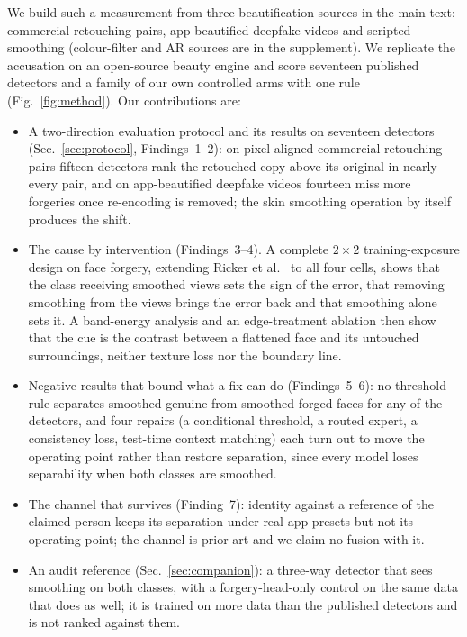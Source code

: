 \documentclass[conference]{IEEEtran}
\begin{document}
We build such a measurement from three beautification sources in the main text: commercial retouching pairs, app-beautified
deepfake videos and scripted smoothing (colour-filter and AR sources are in the supplement). We replicate the accusation on an
open-source beauty engine and score seventeen published detectors and a family of our own controlled arms with one rule (Fig.~\ref{fig:method}). Our contributions are:
\begin{itemize}
\item A two-direction evaluation protocol and its results on seventeen detectors (Sec.~\ref{sec:protocol},
Findings~1--2): on pixel-aligned commercial retouching pairs fifteen detectors rank the retouched copy above its original
in nearly every pair, and on app-beautified deepfake videos fourteen miss more forgeries once re-encoding is removed; the
skin smoothing operation by itself produces the shift.
\item The cause by intervention (Findings~3--4). A complete $2\times2$ training-exposure design on face forgery, extending Ricker et al.~\cite{ricker2026biasid} to all four cells, shows that the class receiving smoothed views sets the
sign of the error, that removing smoothing from the views brings the error back and that smoothing alone sets it. A
band-energy analysis and an edge-treatment ablation then show that the cue is the contrast between a flattened face and its
untouched surroundings, neither texture loss nor the boundary line.
\item Negative results that bound what a fix can do (Findings~5--6): no threshold rule separates smoothed genuine from
smoothed forged faces for any of the detectors, and four repairs (a conditional threshold, a routed expert, a consistency
loss, test-time context matching) each turn out to move the operating point rather than restore separation, since every
model loses separability when both classes are smoothed.
\item The channel that survives (Finding~7): identity against a reference of the claimed person keeps its separation under
real app presets but not its operating point; the channel is prior art and we claim no fusion with it.
\item An audit reference (Sec.~\ref{sec:companion}): a three-way detector that sees smoothing on both classes, with a
forgery-head-only control on the same data that does as well; it is trained on more data than the published detectors and
is not ranked against them.
\end{itemize}
\end{document}
